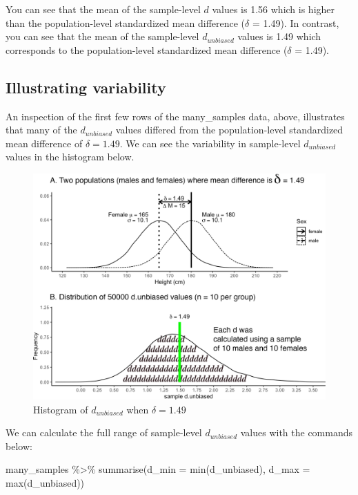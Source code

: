\documentclass[
]{krantz}
\makeatletter
\newenvironment{Shaded}{\begin{snugshade}}{\end{snugshade}}
\newcommand{\AttributeTok}[1]{\textcolor[rgb]{0.61,0.61,0.61}{#1}}
\newcommand{\FunctionTok}[1]{\textcolor[rgb]{0,0,0}{#1}}
\newcommand{\NormalTok}[1]{#1}
\newcommand{\SpecialCharTok}[1]{\textcolor[rgb]{0,0,0}{#1}}
\newenvironment{kframe}{%
\medskip{}
\setlength{\fboxsep}{.8em}
 \def\at@end@of@kframe{}%
 \ifinner\ifhmode%
  \def\at@end@of@kframe{\end{minipage}}%
  \begin{minipage}{\columnwidth}%
 \fi\fi%
 \def\FrameCommand##1{\hskip\@totalleftmargin \hskip-\fboxsep
 \colorbox{shadecolor}{##1}\hskip-\fboxsep
     \hskip-\linewidth \hskip-\@totalleftmargin \hskip\columnwidth}%
 \MakeFramed {\advance\hsize-\width
   \@totalleftmargin\z@ \linewidth\hsize
   \@setminipage}}%
 {\par\unskip\endMakeFramed%
 \at@end@of@kframe}
\renewenvironment{Shaded}{\begin{kframe}}{\end{kframe}}
\makeatother
\begin{document}
You can see that the mean of the sample-level \(d\) values is 1.56 which is higher than the population-level standardized mean difference (\(\delta\) = 1.49). In contrast, you can see that the mean of the sample-level \(d_{unbiased}\) values is 1.49 which corresponds to the population-level standardized mean difference (\(\delta\) = 1.49).

\hypertarget{illustrating-variability}{%
\subsection{Illustrating variability}\label{illustrating-variability}}

An inspection of the first few rows of the many\_samples data, above, illustrates that many of the \(d_{unbiased}\) values differed from the population-level standardized mean difference of \(\delta = 1.49\). We can see the variability in sample-level \(d_{unbiased}\) values in the histogram below.

\begin{figure}
\includegraphics[width=0.95\linewidth]{ch_samples/images/d_dist} \caption{Histogram of $d_{unbiased}$ when $\delta = 1.49$}\label{fig:ddist}
\end{figure}

We can calculate the full range of sample-level \(d_{unbiased}\) values with the commands below:

\begin{Shaded}
\begin{Highlighting}[]
\NormalTok{many\_samples }\SpecialCharTok{\%\textgreater{}\%}
  \FunctionTok{summarise}\NormalTok{(}\AttributeTok{d\_min =} \FunctionTok{min}\NormalTok{(d\_unbiased),}
            \AttributeTok{d\_max =} \FunctionTok{max}\NormalTok{(d\_unbiased))}
\end{Highlighting}
\end{Shaded}
\end{document}
